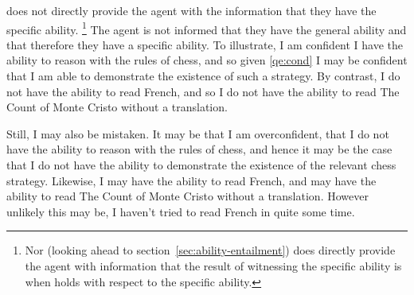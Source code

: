 \begin{note}
  \gsi{} does not directly provide the agent with the information that they have the specific ability.\nolinebreak
  \footnote{Nor (looking ahead to section~\ref{sec:ability-entailment}) does \gsi{} directly provide the agent with information that the result of witnessing the specific ability is when  holds with respect to the specific ability.}
  The agent is not informed that they have the general ability and that therefore they have a specific ability.
  To illustrate, I am confident I have the ability to reason with the rules of chess, and so given \ref{qe:cond} I may be confident that I am able to demonstrate the existence of such a strategy.
  By contrast, I do not have the ability to read French, and so I do not have the ability to read The Count of Monte Cristo without a translation.

  Still, I may also be mistaken.
  It may be that I am overconfident, that I do not have the ability to reason with the rules of chess, and hence it may be the case that I do not have the ability to demonstrate the existence of the relevant chess strategy.
  Likewise, I may have the ability to read French, and may have the ability to read The Count of Monte Cristo without a translation.
  However unlikely this may be, I haven't tried to read French in quite some time.
\end{note}

